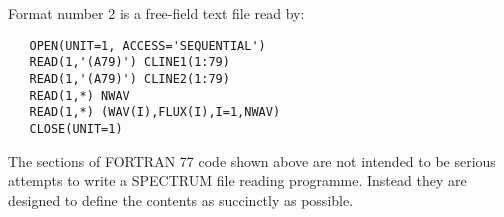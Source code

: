Format number 2 is a free-field text file read by:

\begin{verbatim}
   OPEN(UNIT=1, ACCESS='SEQUENTIAL')
   READ(1,'(A79)') CLINE1(1:79)
   READ(1,'(A79)') CLINE2(1:79)
   READ(1,*) NWAV
   READ(1,*) (WAV(I),FLUX(I),I=1,NWAV)
   CLOSE(UNIT=1)
\end{verbatim}

The sections of FORTRAN 77 code shown above are not intended to be serious
attempts to write a SPECTRUM file reading programme.  Instead they are designed
to define the contents as succinctly as possible.

\typeout{ }
\typeout{*****************************************************}
\typeout{ }
\typeout{ }
\typeout{*****************************************************}
\typeout{ }


